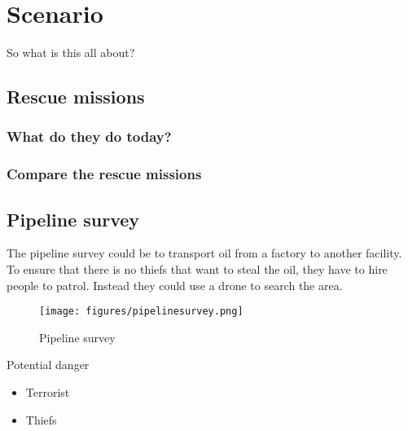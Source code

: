 \chapter{Scenario}\label{ch:scenario}
So what is this all about?

\section{Rescue missions}
\subsection{What do they do today?}
\subsection{Compare the rescue missions}

\section{Pipeline survey}
The pipeline survey could be to transport oil from a factory to another facility. To ensure that there is no thiefs that want to steal the oil, they have to hire people to patrol. Instead they could use a drone to search the area.
\begin{figure}[hb]
  \centering
  \texttt{[image: figures/pipelinesurvey.png]}
  \caption[Pipeline survey]
   {Pipeline survey}
\end{figure}
Potential danger
\begin{itemize}
\item Terrorist
\item Thiefs
\end{itemize}